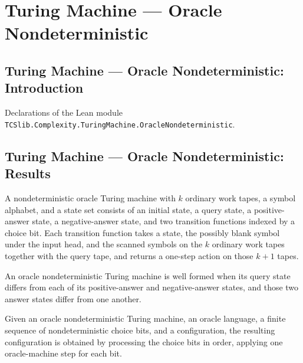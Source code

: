 \section{Turing Machine --- Oracle Nondeterministic}
\subsection*{Turing Machine --- Oracle Nondeterministic: Introduction}

Declarations of the Lean module \texttt{TCSlib.Complexity.TuringMachine.OracleNondeterministic}.

\subsection*{Turing Machine --- Oracle Nondeterministic: Results}

\begin{definition}
\label{Turing.OracleNDTM}
\leanok
{}
A nondeterministic oracle Turing machine with $k$ ordinary work tapes, a symbol
alphabet, and a state set consists of an initial state, a query state, a positive-answer
state, a negative-answer state, and two transition functions indexed by a choice bit.
Each transition function takes a state, the possibly blank symbol under the input head,
and the scanned symbols on the $k$ ordinary work tapes together with the query tape, and
returns a one-step action on those $k+1$ tapes.
\end{definition}

\begin{definition}
\label{Turing.OracleNDTM.WellFormed}
\leanok
{}
An oracle nondeterministic Turing machine is well formed when its query state differs
from each of its positive-answer and negative-answer states, and those two answer states
differ from one another.
\end{definition}

\begin{definition}
\label{Turing.OracleNDTM.stepWith}
\leanok
{}
Given an oracle nondeterministic Turing machine, an oracle language, a finite sequence
of nondeterministic choice bits, and a configuration, the resulting configuration is
obtained by processing the choice bits in order, applying one oracle-machine step for
each bit.
\end{definition}

